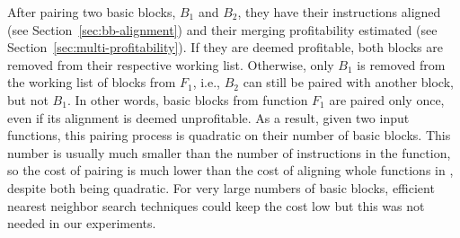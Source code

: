 







After pairing two basic blocks, $B_1$ and $B_2$, they have their instructions aligned (see Section~\ref{sec:bb-alignment}) and their merging profitability estimated (see Section~\ref{sec:multi-profitability}).
If they are deemed profitable, both blocks are removed from their respective working list.
Otherwise, only $B_1$ is removed from the working list of blocks from $F_1$, i.e., $B_2$ can still be paired with another block, but not $B_1$.
In other words, basic blocks from function $F_1$ are paired only once, even if its alignment is deemed unprofitable.
As a result, given two input functions, this pairing process is quadratic on their number of basic blocks.
This number is usually much smaller than the number of instructions in the function, so the cost of pairing is much lower than the cost of aligning whole functions in {\SOAName}, despite both being quadratic. For very large numbers of basic blocks, efficient nearest neighbor search techniques could keep the cost low but this was not needed in our experiments.

